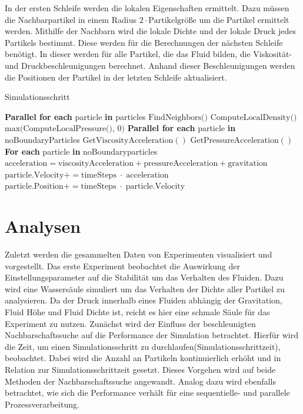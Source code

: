 \documentclass[a4paper, 12pt]{article}
\begin{document}
In der ersten Schleife werden die lokalen Eigenschaften ermittelt. Dazu müssen die Nachbarpartikel in einem Radius $2 \cdot \text{Partikelgröße}$ um die Partikel ermittelt werden. Mithilfe der Nachbarn wird die lokale Dichte und der lokale Druck jedes Partikels bestimmt. Diese werden für die Berechnungen der nächsten Schleife benötigt. In dieser werden für alle Partikel, die das Fluid bilden, die Viskosität- und Druckbeschleunigungen berechnet. Anhand dieser Beschleunigungen werden die Positionen der Partikel in der letzten Schleife aktualisiert. 

\begin{algorithm}[H]
	\caption{Simulationsschritt}
	\begin{algorithmic}[1]
	\State \textbf{Parallel for each} particle \textbf{in} particles
	\State \quad $\text{FindNeighbors()}$
	\State \quad $\text{ComputeLocalDensity()}$ \hfill {}
	\State \quad $\text{max(ComputeLocalPressure(), 0)}$ \hfill {}
	\vspace{1em}
	\State \textbf{Parallel for each} particle \textbf{in} noBoundaryParticles
	\State \quad $\text{GetViscosityAcceleration}()$ \hfill {}
	\State \quad $\text{GetPressureAcceleration}()$ \hfill {}
	\vspace{1em}
	\State \textbf{For each} particle \textbf{in} noBoundaryparticles
	\State \quad $\text{acceleration} = \text{viscosityAcceleration} + \text{pressureAcceleration} + \text{gravitation}$
	\State \quad $\text{particle.Velocity} += \text{timeSteps}\;\cdot\;\text{acceleration}$
	\State \quad $\text{particle.Position} += \text{timeSteps}\;\cdot\;\text{particle.Velocity}$
	\end{algorithmic}
	\end{algorithm}

\section{Analysen} \label{Kap:Alanysen}
Zuletzt werden die gesammelten Daten von Experimenten visualisiert und vorgestellt. Das erste Experiment beobachtet die Auswirkung der Einstellungsparameter auf die Stabilität um das Verhalten des Fluiden. Dazu wird eine Wassersäule simuliert um das Verhalten der Dichte aller Partikel zu analysieren. Da der Druck innerhalb eines Fluiden abhängig der Gravitation, Fluid Höhe und Fluid Dichte ist, reicht es hier eine schmale Säule für das Experiment zu nutzen. 
Zunächst wird der Einfluss der beschleunigten Nachbarschaftssuche auf die Performance der Simulation betrachtet. Hierfür wird die Zeit, um einen Simulationsschritt zu durchlaufen(Simulationsschrittzeit), beobachtet. Dabei wird die Anzahl an Partikeln kontinuierlich erhöht und in Relation zur Simulationsschrittzeit gesetzt. Dieses Vorgehen wird auf beide Methoden der Nachbarschaftssuche angewandt.
Analog dazu wird ebenfalls betrachtet, wie sich die Performance verhält für eine sequentielle- und parallele Prozessverarbeitung.
\end{document}
